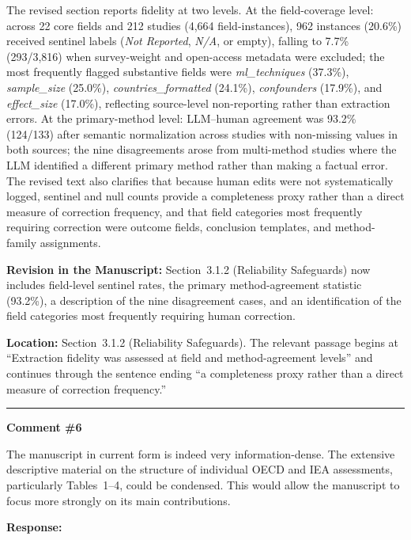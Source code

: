 \documentclass[12pt, a4paper]{article}
\begin{document}
The revised section reports fidelity at two levels. At the field-coverage level: across 22 core
fields and 212 studies (4,664 field-instances), 962 instances (20.6\%) received sentinel labels
(\textit{Not Reported}, \textit{N/A}, or empty), falling to 7.7\% (293/3,816) when survey-weight
and open-access metadata were excluded; the most frequently flagged substantive fields were
\textit{ml\_techniques} (37.3\%), \textit{sample\_size} (25.0\%), \textit{countries\_formatted}
(24.1\%), \textit{confounders} (17.9\%), and \textit{effect\_size} (17.0\%), reflecting
source-level non-reporting rather than extraction errors. At the primary-method level: LLM--human
agreement was 93.2\% (124/133) after semantic normalization across studies with non-missing values
in both sources; the nine disagreements arose from multi-method studies where the LLM identified
a different primary method rather than making a factual error. The revised text also clarifies that
because human edits were not systematically logged, sentinel and null counts provide a completeness
proxy rather than a direct measure of correction frequency, and that field categories most
frequently requiring correction were outcome fields, conclusion templates, and method-family
assignments.

\medskip
\noindent\textbf{Revision in the Manuscript:}
Section~3.1.2 (Reliability Safeguards) now includes field-level sentinel rates, the primary
method-agreement statistic (93.2\%), a description of the nine disagreement cases, and an
identification of the field categories most frequently requiring human correction.

\medskip
\noindent\textbf{Location:} Section~3.1.2 (Reliability Safeguards). The relevant passage begins
at ``Extraction fidelity was assessed at field and method-agreement levels'' and continues through
the sentence ending ``a completeness proxy rather than a direct measure of correction frequency.''

\bigskip\hrule\bigskip

\noindent\textbf{Comment \#6}

\medskip
\noindent\textcolor{reviewerblue}{%
The manuscript in current form is indeed very information-dense. The extensive descriptive material
on the structure of individual OECD and IEA assessments, particularly Tables~1--4, could be
condensed. This would allow the manuscript to focus more strongly on its main contributions.}

\medskip
\noindent\textbf{Response:}
\end{document}
